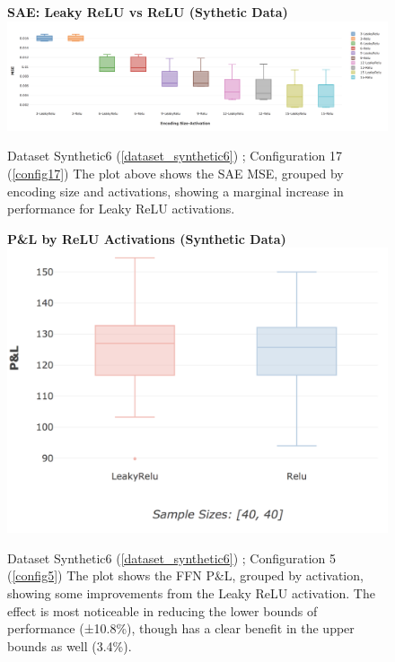 \documentclass[a4paper,11pt,oneside]{article}
\theoremstyle{plain}
\theoremstyle{definition}
\begin{document}
		\begin{figure}[H]
		\centering 
		\textbf{SAE: Leaky ReLU vs ReLU (Sythetic Data)} 
		\includegraphics[scale=0.28]{images/results/activations/synthetic_mse_leakyrelu.png}
		\caption[SAE: Leaky ReLU vs ReLU (Synthetic Data)]{Dataset Synthetic6  (\ref{dataset_synthetic6}) ; Configuration 17 (\ref{config17})
			\newline The plot above shows the SAE MSE, grouped by encoding size and activations, showing a marginal increase in performance for Leaky ReLU activations. }
		\label{figure-synthetic_mse_leakyrelu}
	\end{figure}
	
	\begin{figure}[H]
		\textbf{P\&L by ReLU Activations (Synthetic Data)}
		\centering
		\includegraphics[scale=0.3]{images/results/activations/synthetic_pl_leakyrelu.png}
		\caption[P\&L by ReLU Activations (Synthetic Data)]{Dataset Synthetic6  (\ref{dataset_synthetic6}) ; Configuration 5 (\ref{config5})
			\newline The plot shows the FFN P\&L, grouped by activation, showing some improvements from the Leaky ReLU activation. The effect is most noticeable in reducing the lower bounds of performance (±10.8\%), though has a clear benefit in the upper bounds as well (3.4\%).}
		\label{figure-synthetic_pl_leakyrelu}
	\end{figure}
	
\end{document}

